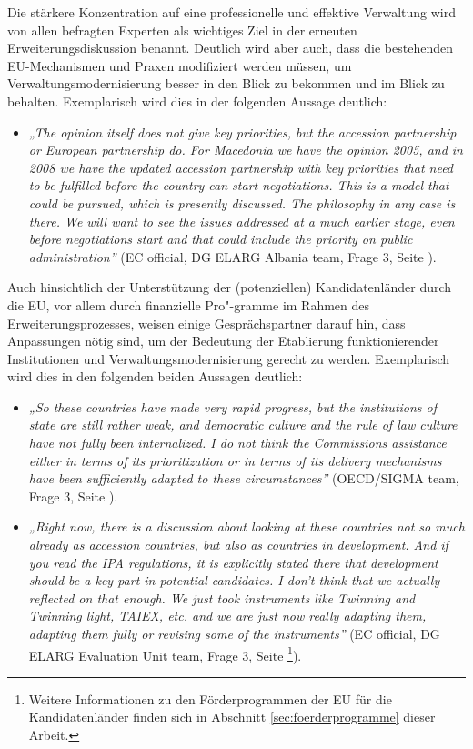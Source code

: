 Die stärkere Konzentration auf eine professionelle und effektive Verwaltung wird von allen befragten Experten als wichtiges Ziel in der erneuten Erweiterungsdiskussion benannt. Deutlich wird aber auch, dass die bestehenden EU-Mechanismen und Praxen modifiziert werden müssen, um Verwaltungsmodernisierung besser in den Blick zu bekommen und im Blick zu behalten. Exemplarisch wird dies in der folgenden Aussage deutlich: 
\begin{itemize}[label={}]
\item \textit{„The opinion itself does not give key priorities, but the accession partnership or European partnership do. For Macedonia we have the opinion 2005, and in 2008 we have the updated accession partnership with key priorities that need to be fulfilled before the country can start negotiations. This is a model that could be pursued, which is presently discussed. The philosophy in any case is there. We will want to see the issues addressed at a much earlier stage, even before negotiations start and that could include the priority on public administration”} (EC official, DG ELARG Albania team, Frage 3, Seite \pageref{sec:enlargement}).\end{itemize}
Auch hinsichtlich der Unterstützung der (potenziellen) Kandidatenländer durch die EU, vor allem durch finanzielle Pro"-gramme im Rahmen des Erweiterungsprozesses, weisen einige Gesprächspartner darauf hin, dass Anpassungen nötig sind, um der Bedeutung der Etablierung funktionierender Institutionen und Verwaltungsmodernisierung gerecht zu werden. Exemplarisch wird dies in den folgenden beiden Aussagen deutlich:
\begin{itemize}[label={}]
\item \textit{„So these countries have made very rapid progress, but the institutions of state are still rather weak, and democratic culture and the rule of law culture have not fully been internalized. I do not think the Commissions assistance either in terms of its prioritization or in terms of its delivery mechanisms have been sufficiently adapted to these circumstances”} (OECD/SIGMA team, Frage 3, Seite \pageref{sec:enlargement}).
\item \textit{„Right now, there is a discussion about looking at these countries not so much already as accession countries, but also as countries in development. And if you read the IPA regulations, it is explicitly stated there that development should be a key part in potential candidates. I don’t think that we actually reflected on that enough. We just took instruments like Twinning and Twinning light, TAIEX, etc. and we are just now really adapting them, adapting them fully or revising some of the instruments”} (EC official, DG ELARG Evaluation Unit team, Frage 3, Seite \pageref{sec:enlargement}\footnote{Weitere Informationen zu den Förderprogrammen der EU für die Kandidatenländer finden sich in Abschnitt \ref{sec:foerderprogramme} dieser Arbeit.}).
\end{itemize}
